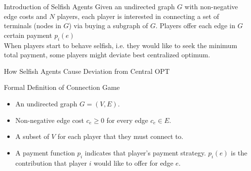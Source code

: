 \documentclass[11pt,aspectratio=169]{beamer}
\begin{document}
\begin{frame}{Introduction of Selfish Agents}
Given an undirected graph \(G\) with non-negative edge costs and \(N\) players, each player is interested in connecting a set of terminals (nodes in \(G\)) via buying a subgraph of \(G\). Players offer each edge in \(G\) certain payment $p_i(e)$\\
\vspace{10pt}
When players start to behave selfish, i.e. they would like to seek the minimum total payment, some players might deviate best centralized optimum. 
\end{frame}
\begin{frame}{How Selfish Agents Cause Deviation from Central OPT}
    \begin{figure}
    \begin{center}
\hspace*{10pt}
\hspace*{10pt}
    
\end{center}
\end{figure}
\end{frame}


\begin{frame}{Formal Definition of Connection Game}
    \begin{definition}
          \begin{itemize}
            \item An undirected graph \(G = (V,E)\).
            \item Non-negative edge cost \(c_e \geq 0\) for every edge $c_e \in E$.
            \item A subset of \(V\) for each player that they must connect to. 
            \item A payment function \(p_i\) indicates that player's payment strategy. \(p_i(e)\) is the contribution that player \(i\) would like to offer for edge \(e\).
    \end{itemize}
    \end{definition}
\end{frame}
\end{document}
